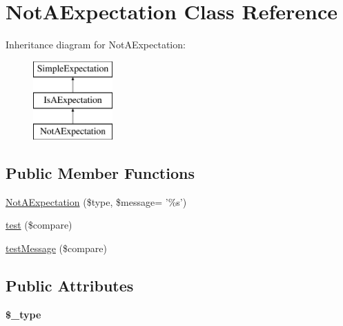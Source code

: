 \hypertarget{class_not_a_expectation}{
\section{NotAExpectation Class Reference}
\label{class_not_a_expectation}
}
Inheritance diagram for NotAExpectation:\begin{figure}[H]
\begin{center}
\leavevmode
\includegraphics[height=3.000000cm]{class_not_a_expectation}
\end{center}
\end{figure}
\subsection*{Public Member Functions}
\begin{DoxyCompactItemize}
\item 
\hyperlink{class_not_a_expectation_ac5376f9e05d830a311ca7cae4beb2af8}{NotAExpectation} (\$type, \$message= '\%s')
\item 
\hyperlink{class_not_a_expectation_a627e4e3a4514de8f869eaa5f62a5e206}{test} (\$compare)
\item 
\hyperlink{class_not_a_expectation_aecc6099e1b98a0b00f798e43a8add4fa}{testMessage} (\$compare)
\end{DoxyCompactItemize}
\subsection*{Public Attributes}
\begin{DoxyCompactItemize}
\item 
\hypertarget{class_not_a_expectation_a87065cc077783de6b169d3d2fac0a594}{
{\bfseries \$\_\-type}}
\label{class_not_a_expectation_a87065cc077783de6b169d3d2fac0a594}

\end{DoxyCompactItemize}


